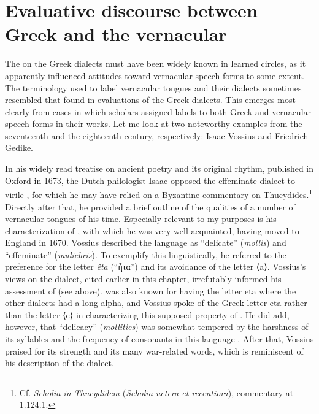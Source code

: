 \section{Evaluative discourse between Greek and the vernacular}\label{sec:7.3}


The  on the Greek dialects must have been widely known in learned circles, as it apparently influenced attitudes toward vernacular speech forms to some extent. The terminology used to label vernacular tongues and their dialects sometimes resembled that found in evaluations of the Greek dialects. This emerges most clearly from cases in which scholars assigned labels to both Greek and vernacular speech forms in their works. Let me look at two noteworthy examples from the seventeenth and the eighteenth century, respectively: Isaac Vossius and Friedrich Gedike.

In his widely read treatise on ancient poetry and its original rhythm, published in Oxford in 1673, the Dutch philologist Isaac \citet[54--55]{Vossius1673} opposed the effeminate  dialect to virile , for which he may have relied on a Byzantine commentary on Thucydides.\footnote{Cf. \textit{Scholia in Thucydidem} (\textit{Scholia uetera et recentiora}), commentary at 1.124.1.} Directly after that, he provided a brief outline of the qualities of a number of vernacular tongues of his time. Especially relevant to my purposes is his characterization of , with which he was very well acquainted, having moved to England in 1670. Vossius described the language as “delicate” (\textit{mollis}) and “effeminate” (\textit{muliebris}). To exemplify this linguistically, he referred to the  preference for the letter \textit{êta} (“ἦτα”) and its avoidance of the letter ⟨a⟩. Vossius’s views on the  dialect, cited earlier in this chapter, irrefutably informed his assessment of  (see  above).  was also known for having the letter eta where the other dialects had a long alpha, and Vossius spoke of the Greek letter eta rather than the  letter ⟨e⟩ in characterizing this supposed property of . He did add, however, that  “delicacy” (\textit{mollities}) was somewhat tempered by the harshness of its syllables and the frequency of consonants in this language \citep[56]{Vossius1673}. After that, Vossius praised  for its strength and its many war-related words, which is reminiscent of his description of the  dialect.

